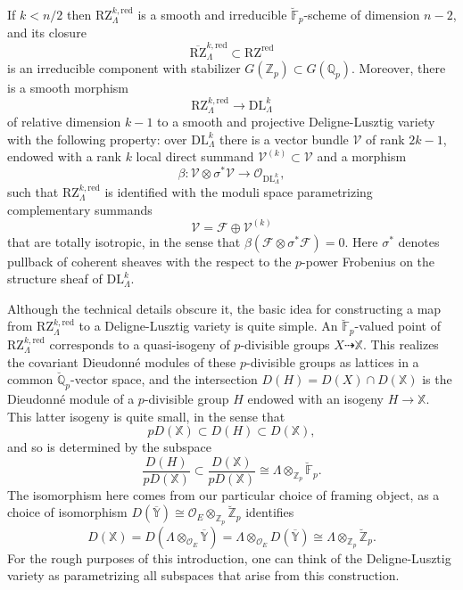 \documentclass[11pt]{alggeom}
\newcommand{\iso}{\cong}
\newcommand{\red}{\mathrm{red}}
\newcommand{\Q}{\mathbb Q}
\newcommand{\Z}{\mathbb Z}
\newcommand{\F}{\mathbb F}
\newcommand{\co}{\mathcal O}
\begin{document}
\begin{bigtheorem}\label{bigthmA}
If $k < n/2$ then $\mathrm{RZ}_\Lambda^{k,\red}$ is a smooth and irreducible $\breve{\F}_p$-scheme of dimension $n-2$, and its  closure 
 \[
 \overline{\mathrm{RZ}}_\Lambda^{k,\red} \subset  \mathrm{RZ}^\red
 \]
  is an irreducible component with stabilizer  $G(\Z_p)\subset G(\Q_p)$.
Moreover, there is a smooth morphism 
\[
\mathrm{RZ}_\Lambda^{k,\red} \to \mathrm{DL}_\Lambda^k
\]
of relative dimension $k-1$ to a smooth and projective Deligne-Lusztig variety with the following property: over  $ \mathrm{DL}_\Lambda^k$ there is a vector bundle $\mathscr{V}$ of rank $2k-1$, endowed with a rank $k$ local direct summand $\mathscr{V}^{(k)} \subset \mathscr{V}$ and a morphism
\[
\beta : \mathscr{V} \otimes \sigma^* \mathscr{V} \to \co_{ \mathrm{DL}_\Lambda^k } ,
\]
such that $\mathrm{RZ}_\Lambda^{k,\red}$ is identified with the moduli space parametrizing 
complementary summands 
\[
\mathscr{V} = \mathscr{F} \oplus \mathscr{V}^{(k)}
\]
that are  totally isotropic, in the sense that $\beta(\mathscr{F} \otimes \sigma^*\mathscr{F})=0$.  Here $\sigma^*$ denotes pullback of coherent sheaves with the respect to the $p$-power Frobenius on the structure sheaf of $\mathrm{DL}_\Lambda^k$.
\end{bigtheorem}
 

 
 Although the technical details obscure it, 
the basic idea for constructing a map from $\mathrm{RZ}_\Lambda^{k,\red}$ to a Deligne-Lusztig variety is quite simple.  
An $\breve{\F}_p$-valued point of $\mathrm{RZ}_\Lambda^{k,\red}$ corresponds to a quasi-isogeny of $p$-divisible groups $X \dashrightarrow \mathbb{X}$.  
This realizes the covariant Dieudonn\'e modules of these $p$-divisible groups as lattices in  a common $\breve{\Q}_p$-vector space, and the intersection 
 $
 D(H) = D(X) \cap D( \mathbb{X})
 $
 is the Dieudonn\'e module of a  $p$-divisible group $H$ endowed with an isogeny $H \to  \mathbb{X}$.  
 This latter isogeny is quite small, in the sense that 
 \[
pD( \mathbb{X} ) \subset   D(H)  \subset  D( \mathbb{X}), 
 \]
and so  is determined by  the subspace
 \[
   \frac{ D(H)  }{ p D( \mathbb{X} )  }  \subset 
   \frac{  D( \mathbb{X}) }{  p D( \mathbb{X}) } \iso \Lambda\otimes_{\Z_p} \breve{\F}_p.
 \]
 The isomorphism here comes from our particular choice of framing object, as  a choice of isomorphism $D( \overline{\mathbb{Y}} ) \iso \co_E\otimes_{\Z_p} \breve{\Z}_p$ identifies
 \[
 D( \mathbb{X}) = D( \Lambda \otimes_{\co_E} \overline{\mathbb{Y}} ) 
 = \Lambda\otimes_{\co_E} D(  \overline{\mathbb{Y}} )  \iso \Lambda\otimes_{\Z_p} \breve{\Z}_p.
 \]
For the rough purposes of this introduction,  one can think of the Deligne-Lusztig variety  as parametrizing all subspaces   that arise from this construction.    
\end{document}
